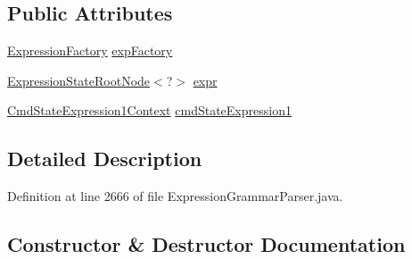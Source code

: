 \subsection*{Public Attributes}
\begin{DoxyCompactItemize}
\item 
\hyperlink{classgov_1_1nasa_1_1jpf_1_1inspector_1_1server_1_1expression_1_1_expression_factory}{Expression\+Factory} \hyperlink{classgov_1_1nasa_1_1jpf_1_1inspector_1_1server_1_1expression_1_1parser_1_1_expression_grammar_pa37db371aaa956234112b7f14e4ab3f14_a916a26685569bdfd4dbdc9a6909e9b02}{exp\+Factory}
\item 
\hyperlink{interfacegov_1_1nasa_1_1jpf_1_1inspector_1_1server_1_1expression_1_1_expression_state_root_node}{Expression\+State\+Root\+Node}$<$?$>$ \hyperlink{classgov_1_1nasa_1_1jpf_1_1inspector_1_1server_1_1expression_1_1parser_1_1_expression_grammar_pa37db371aaa956234112b7f14e4ab3f14_a89be3036854926f4b98c61708a180f1a}{expr}
\item 
\hyperlink{classgov_1_1nasa_1_1jpf_1_1inspector_1_1server_1_1expression_1_1parser_1_1_expression_grammar_pa1eb341e049a8047f26aa8b84266a8b94}{Cmd\+State\+Expression1\+Context} \hyperlink{classgov_1_1nasa_1_1jpf_1_1inspector_1_1server_1_1expression_1_1parser_1_1_expression_grammar_pa37db371aaa956234112b7f14e4ab3f14_a8315e2ead227273a2cbfedfc30ed8806}{cmd\+State\+Expression1}
\end{DoxyCompactItemize}


\subsection{Detailed Description}


Definition at line 2666 of file Expression\+Grammar\+Parser.\+java.



\subsection{Constructor \& Destructor Documentation}
